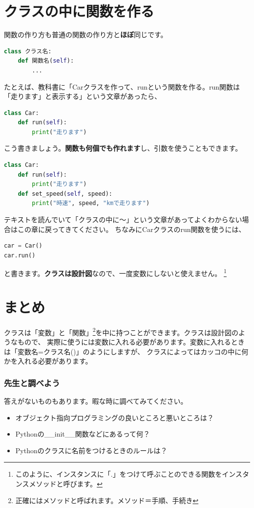 \documentclass[12pt, a4paper, dvipdfmx]{book}
\begin{document}
\newpage
\section{クラスの中に関数を作る}
関数の作り方も普通の関数の作り方と\textbf{ほぼ}同じです。
\begin{lstlisting}[caption=クラスの中に関数を作る,label=sample, language=Python]
class クラス名:
    def 関数名(self):
        ...
\end{lstlisting}
たとえば、教科書に「Carクラスを作って、runという関数を作る。run関数は「走ります」と表示する」という文章があったら、
\begin{lstlisting}[caption=Carクラスの作り方,label=sample, language=Python]
class Car:
    def run(self):
        print("走ります")
\end{lstlisting}
こう書きましょう。\textbf{関数も何個でも作れます}し、引数を使うこともできます。
\begin{lstlisting}[caption=引数を使う場合,label=sample, language=Python]
class Car:
    def run(self):
        print("走ります")
    def set_speed(self, speed):
        print("時速", speed, "kmで走ります")
\end{lstlisting}
テキストを読んでいて「クラスの中に〜」という文章があってよくわからない場合はこの章に戻ってきてください。
ちなみにCarクラスのrun関数を使うには、
\begin{lstlisting}[caption=Carクラスの使い方,label=sample, language=Python]
car = Car()
car.run()
\end{lstlisting}
と書きます。\textbf{クラスは設計図}なので、一度変数にしないと使えません。
\footnote{このように、インスタンスに「.」をつけて呼ぶことのできる関数をインスタンスメソッドと呼びます。}

\section{まとめ}
クラスは「変数」と「関数」\footnote{正確にはメソッドと呼ばれます。メソッド＝手順、手続き}を中に持つことができます。クラスは設計図のようなもので、
実際に使うには変数に入れる必要があります。変数に入れるときは「変数名=クラス名()」のようにしますが、
クラスによってはカッコの中に何かを入れる必要があります。

\subsubsection{先生と調べよう}
答えがないものもあります。暇な時に調べてみてください。
\begin{itemize}
  \item オブジェクト指向プログラミングの良いところと悪いところは？
  \item Pythonの\_\_init\_\_関数などにあるって何？
  \item Pythonのクラスに名前をつけるときのルールは？
\end{itemize}
\end{document}
